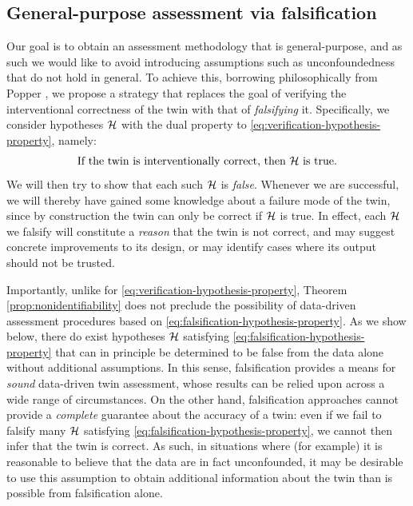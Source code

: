 %
%


\subsection{General-purpose assessment via falsification}

Our goal is to obtain an assessment methodology that is general-purpose, and as such we would like to avoid introducing assumptions such as unconfoundedness that do not hold in general.
%
To achieve this, borrowing philosophically from Popper \cite{popper2005logic}, we propose a strategy that replaces the goal of verifying the interventional correctness of the twin with that of \emph{falsifying} it.
Specifically, we consider hypotheses $\mathcal{H}$ with the dual property to \eqref{eq:verification-hypothesis-property}, namely:
\begin{equation} \label{eq:falsification-hypothesis-property}
    \text{If the twin is interventionally correct, then $\mathcal{H}$ is true.}
\end{equation}
We will then try to show that each such $\mathcal{H}$ is \emph{false}.
%
Whenever we are successful, we will thereby have gained some knowledge about a failure mode of the twin, since by construction the twin can only be correct if $\mathcal{H}$ is true.
In effect, each $\mathcal{H}$ we falsify will constitute a \emph{reason} that the twin is not correct, and may suggest concrete improvements to its design, or may identify cases where its output should not be trusted.

Importantly, unlike for \eqref{eq:verification-hypothesis-property}, Theorem \ref{prop:nonidentifiability} does not preclude the possibility of data-driven assessment procedures based on \eqref{eq:falsification-hypothesis-property}.
As we show below, there do exist hypotheses $\mathcal{H}$ satisfying \eqref{eq:falsification-hypothesis-property} that can in principle be determined to be false from the data alone without additional assumptions.
In this sense, falsification provides a means for \emph{sound} data-driven twin assessment, %
whose results can be relied upon across a wide range of circumstances.
On the other hand, falsification approaches cannot provide a \emph{complete} guarantee about the accuracy of a twin: even if we fail to falsify many $\mathcal{H}$ satisfying \eqref{eq:falsification-hypothesis-property}, we cannot then infer that the twin is correct.
As such, in situations where (for example) it is reasonable to believe that the data are in fact unconfounded, it may be desirable to use this assumption to obtain additional information about the twin than is possible from falsification alone.
%


